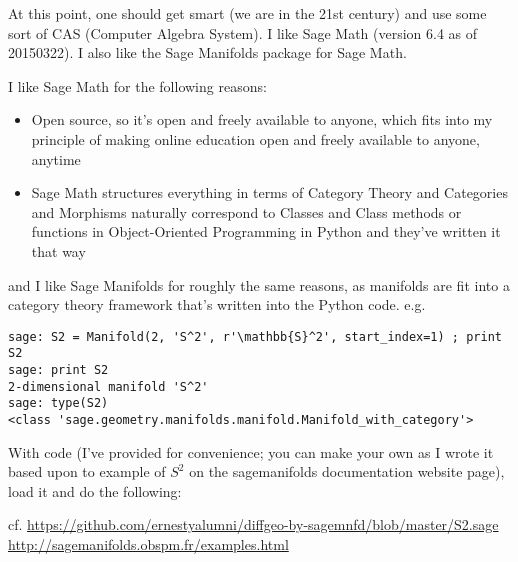At this point, one should get smart (we are in the 21st century) and use some sort of CAS (Computer Algebra System). I like Sage Math (version 6.4 as of 20150322).  I also like the Sage Manifolds package for Sage Math.  

I like Sage Math for the following reasons:
\begin{itemize}
\item Open source, so it’s open and freely available to anyone, which fits into my principle of making online education open and freely available to anyone, anytime
\item Sage Math structures everything in terms of Category Theory and Categories and Morphisms naturally correspond to Classes and Class methods or functions in Object-Oriented Programming in Python and they’ve written it that way
\end{itemize}
and I like Sage Manifolds for roughly the same reasons, as manifolds are fit into a category theory framework that’s written into the Python code.  e.g.

{\small \begin{verbatim}
sage: S2 = Manifold(2, 'S^2', r'\mathbb{S}^2', start_index=1) ; print S2
sage: print S2
2-dimensional manifold 'S^2'
sage: type(S2)
<class 'sage.geometry.manifolds.manifold.Manifold_with_category'>
\end{verbatim}}

With code (I’ve provided for convenience; you can make your own as I wrote it based upon to example of $S^2$ on the sagemanifolds documentation website page), load it and do the following:

cf. \url{https://github.com/ernestyalumni/diffgeo-by-sagemnfd/blob/master/S2.sage} \\
\url{http://sagemanifolds.obspm.fr/examples.html}

